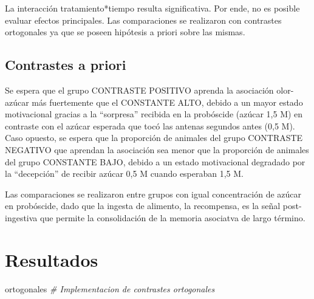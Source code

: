 \documentclass[]{article}
\newenvironment{Shaded}{\begin{snugshade}}{\end{snugshade}}
\newcommand{\CommentTok}[1]{\textcolor[rgb]{0.56,0.35,0.01}{\textit{#1}}}
\newcommand{\NormalTok}[1]{#1}
\begin{document}
La interacción tratamiento*tiempo resulta significativa. Por ende, no es
posible evaluar efectos principales. Las comparaciones se realizaron con
contrastes ortogonales ya que se poseen hipótesis a priori sobre las
mismas.

\hypertarget{contrastes-a-priori}{%
\subsection{Contrastes a priori}\label{contrastes-a-priori}}

Se espera que el grupo CONTRASTE POSITIVO aprenda la asociación
olor-azúcar más fuertemente que el CONSTANTE ALTO, debido a un mayor
estado motivacional gracias a la ``sorpresa'' recibida en la probóscide
(azúcar 1,5 M) en contraste con el azúcar esperada que tocó las antenas
segundos antes (0,5 M). Caso opuesto, se espera que la proporción de
animales del grupo CONTRASTE NEGATIVO que aprendan la asociación sea
menor que la proporción de animales del grupo CONSTANTE BAJO, debido a
un estado motivacional degradado por la ``decepción'' de recibir azúcar
0,5 M cuando esperaban 1,5 M.

Las comparaciones se realizaron entre grupos con igual concentración de
azúcar en probóscide, dado que la ingesta de alimento, la recompensa, es
la señal post-ingestiva que permite la consolidación de la memoria
asociatva de largo término.

\hypertarget{resultados}{%
\section{Resultados}\label{resultados}}

\begin{Shaded}
\begin{Highlighting}[]
\NormalTok{ortogonales }\CommentTok{# Implementacion de contrastes ortogonales}
\end{Highlighting}
\end{Shaded}
\end{document}
